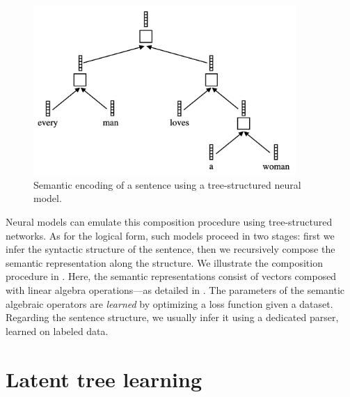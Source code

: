 \begin{figure}[htb!]
	\includegraphics[width=10cm]{images/tree_rnn.png}
	\caption[Tree LSTM]{Semantic encoding of a sentence using a tree-structured neural model.}
\end{figure}

 Neural models can emulate this composition procedure using tree-structured networks. As for the logical form, such models proceed in two stages: first we infer the syntactic structure of the sentence, then we recursively compose the semantic representation along the structure. We illustrate the composition procedure in . Here, the semantic representations consist of vectors composed with linear algebra operations—as detailed in . The parameters of the semantic algebraic operators are \textit{learned} by optimizing a loss function given a dataset. Regarding the sentence structure, we usually infer it using a dedicated parser, learned on labeled data.


\section{Latent tree learning}

